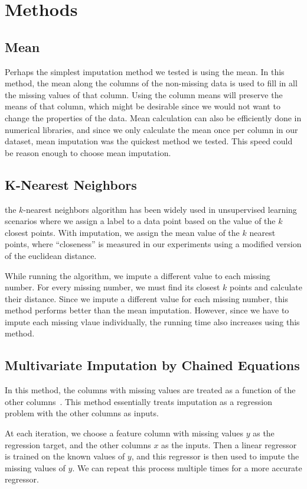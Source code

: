 \documentclass[12pt]{article}
\begin{document}
\section{Methods}
\subsection{Mean}
Perhaps the simplest imputation method we tested is using the mean.
In this method, the mean along the columns of the non-missing data
is used to fill in all the missing values of that column.
Using the column means will preserve the means of that column,
which might be desirable since we would not want to change the 
properties of the data.
Mean calculation can also be efficiently done in numerical libraries, 
and since we only calculate the mean once per column in our dataset, 
mean imputation was the quickest method we tested.
This speed could be reason enough to choose mean imputation.

\subsection{K-Nearest Neighbors}
the $k$-nearest neighbors algorithm has been widely used in unsupervised
learning scenarios where we assign a label to a data point based on the
value of the $k$ closest points.
With imputation, we assign the mean value of the $k$ nearest points,
where ``closeness'' is measured in our experiments using a modified
version of the euclidean distance.

While running the algorithm, we impute a different value to 
each missing number.
For every missing number, we must find its closest $k$ points
and calculate their distance.
Since we impute a different value for each missing number, this 
method performs better than the mean imputation.
However, since we have to impute each missing vlaue individually,
the running time also increases using this method.

\subsection{Multivariate Imputation by Chained Equations}
In this method, the columns with missing values are treated as a 
function of the other columns~\cite{pedregosa2011scikit}.
This method essentially treats imputation as a regression problem
with the other columns as inputs.

At each iteration, we choose a feature column with missing values $y$
as the regression target, and the other columns $x$ as the inputs.
Then a linear regressor is trained on the known values of $y$,
and this regressor is then used to impute the missing values of $y$.
We can repeat this process multiple times for a more accurate regressor.
\end{document}
